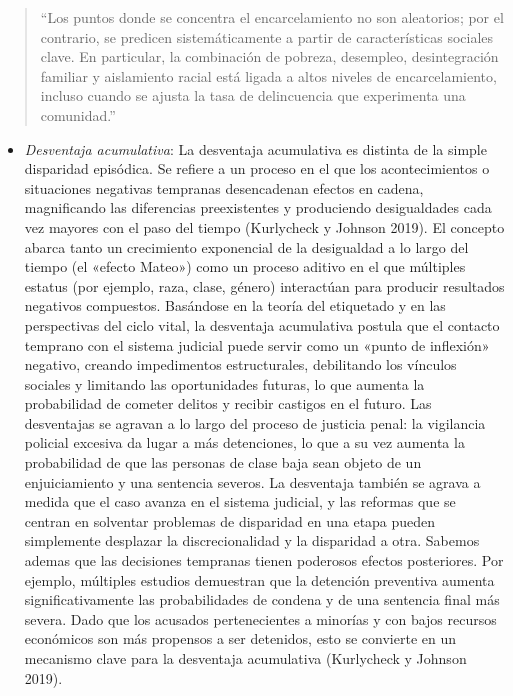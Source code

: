 \documentclass[
  spanish,
  letterpaper,
  DIV=11,
  numbers=noendperiod]{scrreprt}
\providecommand{\tightlist}{%
  \setlength{\itemsep}{0pt}\setlength{\parskip}{0pt}}
\begin{document}
\begin{quote}
``Los puntos donde se concentra el encarcelamiento no son aleatorios;
por el contrario, se predicen sistemáticamente a partir de
características sociales clave. En particular, la combinación de
pobreza, desempleo, desintegración familiar y aislamiento racial está
ligada a altos niveles de encarcelamiento, incluso cuando se ajusta la
tasa de delincuencia que experimenta una comunidad.''
\end{quote}

\begin{itemize}
\tightlist
\item
  \emph{Desventaja acumulativa}: La desventaja acumulativa es distinta
  de la simple disparidad episódica. Se refiere a un proceso en el que
  los acontecimientos o situaciones negativas tempranas desencadenan
  efectos en cadena, magnificando las diferencias preexistentes y
  produciendo desigualdades cada vez mayores con el paso del tiempo
  (Kurlycheck y Johnson 2019). El concepto abarca tanto un crecimiento
  exponencial de la desigualdad a lo largo del tiempo (el «efecto
  Mateo») como un proceso aditivo en el que múltiples estatus (por
  ejemplo, raza, clase, género) interactúan para producir resultados
  negativos compuestos. Basándose en la teoría del etiquetado y en las
  perspectivas del ciclo vital, la desventaja acumulativa postula que el
  contacto temprano con el sistema judicial puede servir como un «punto
  de inflexión» negativo, creando impedimentos estructurales,
  debilitando los vínculos sociales y limitando las oportunidades
  futuras, lo que aumenta la probabilidad de cometer delitos y recibir
  castigos en el futuro. Las desventajas se agravan a lo largo del
  proceso de justicia penal: la vigilancia policial excesiva da lugar a
  más detenciones, lo que a su vez aumenta la probabilidad de que las
  personas de clase baja sean objeto de un enjuiciamiento y una
  sentencia severos. La desventaja también se agrava a medida que el
  caso avanza en el sistema judicial, y las reformas que se centran en
  solventar problemas de disparidad en una etapa pueden simplemente
  desplazar la discrecionalidad y la disparidad a otra. Sabemos ademas
  que las decisiones tempranas tienen poderosos efectos posteriores. Por
  ejemplo, múltiples estudios demuestran que la detención preventiva
  aumenta significativamente las probabilidades de condena y de una
  sentencia final más severa. Dado que los acusados pertenecientes a
  minorías y con bajos recursos económicos son más propensos a ser
  detenidos, esto se convierte en un mecanismo clave para la desventaja
  acumulativa (Kurlycheck y Johnson 2019).
\end{itemize}
\end{document}
